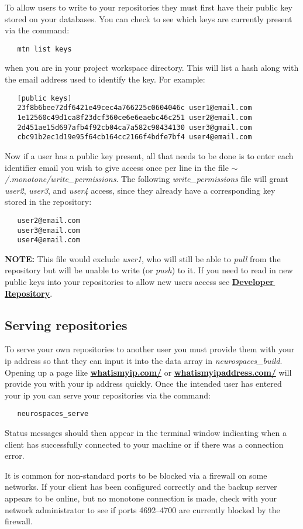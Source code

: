 \documentclass[12pt]{article}
\begin{document}
To allow users to write to your repositories they must first have their public key stored on your databases. You can check to see which keys are currently present via the command:
\begin{verbatim}
   mtn list keys
\end{verbatim}
when you are in your project workspace directory. This will list a hash along with the email address used to identify the key. For example:
\begin{verbatim}
   [public keys]
   23f8b6bee72df6421e49cec4a766225c0604046c user1@email.com
   1e12560c49d1ca8f23dcf360ce6e6eaebc46c251 user2@email.com
   2d451ae15d697afb4f92cb04ca7a582c90434130 user3@gmail.com
   cbc91b2ec1d19e95f64cb164cc2166f4bdfe7bf4 user4@email.com
\end{verbatim}
Now if a user has a public key present, all that needs to be done is to enter each identifier email you wish to give access once per line in the file {\it $\sim$/.monotone/write\_permissions}. The following {\it write\_permissions} file will grant {\it user2}, {\it user3}, and {\it user4} access, since they already have a corresponding key stored in the repository:
\begin{verbatim}
   user2@email.com
   user3@email.com
   user4@email.com
\end{verbatim}
{\bf NOTE:} This file would exclude {\it user1}, who will still be able to {\it pull} from the repository but will be unable to write (or {\it push}) to it.
If you need to read in new public keys into your repositories to allow new users access see \href{../developer-repository/developer-repository.tex}{\bf Developer\,Repository}.

\subsection*{Serving repositories}

To serve your own repositories to another user you must provide them with your ip address so that they can input it into the data array in {\it neurospaces\_build}. Opening up a page like \href{http://whatismyip.com/}{\bf whatismyip.com/} or \href{http://whatismyipaddress.com/}{\bf whatismyipaddress.com/} will provide you with your ip address quickly. Once the intended user has entered your ip you can serve your repositories via the command:
\begin{verbatim}
   neurospaces_serve
\end{verbatim}
Status messages should then appear in the terminal window indicating when a client has successfully connected to your machine or if there was a connection error.

It is common for non-standard ports to be blocked via a firewall on some networks. If your client has been configured correctly and the backup server appears to be online, but no monotone connection is made, check with your network administrator to see if ports 4692--4700 are currently blocked by the firewall. 
\end{document}
